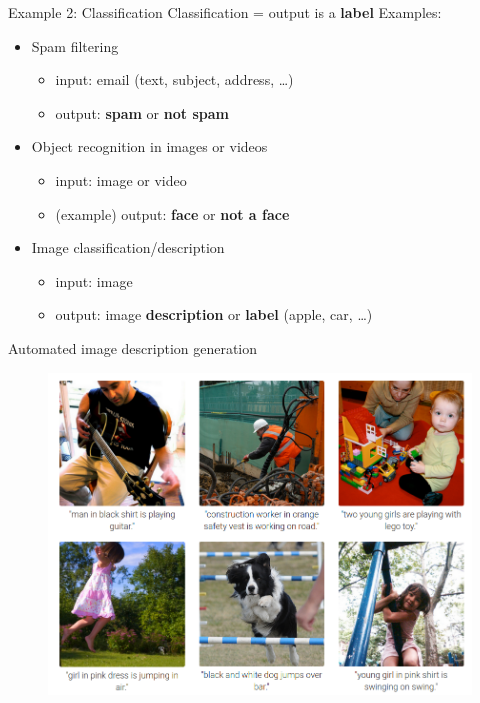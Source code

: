 \documentclass{beamer}
\begin{document}
\begin{frame}{Example 2: Classification}
\vfill
Classification = output is a \textbf{label}
\vfill
Examples: 
\pause
\vfill
\begin{itemize}
	\item Spam filtering
	\begin{itemize}
		\item input: email (text, subject, address, \ldots)
		\item output: \textbf{spam} or \textbf{not spam}
	\end{itemize}
\pause
\vfill
	\item Object recognition in images or videos
	\begin{itemize}
		\item input: image or video
		\item (example) output: \textbf{face} or \textbf{not a face}
	\end{itemize}
\pause
\vfill
	\item Image classification/description
	\begin{itemize}
		\item input: image
		\item output: image \textbf{description} or \textbf{label} (apple, car, \ldots)
	\end{itemize}
\end{itemize}
\vfill

\end{frame}

\begin{frame}{Automated image description generation}

\begin{figure}
\centering
\includegraphics[width=\textwidth]{images/generated_descriptions.png}
\end{figure}
\end{frame}
\end{document}
